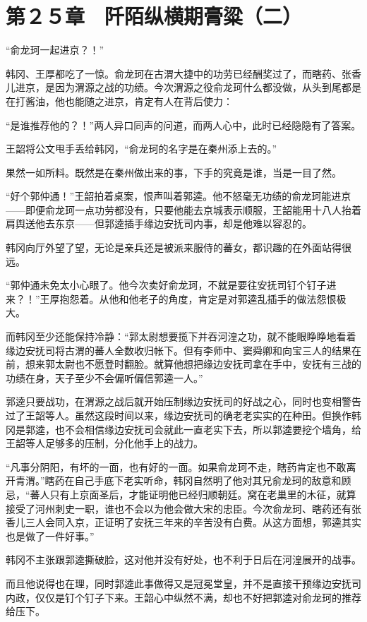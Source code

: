 \section{第２５章　阡陌纵横期膏粱（二）}

“俞龙珂一起进京？！”

韩冈、王厚都吃了一惊。俞龙珂在古渭大捷中的功劳已经酬奖过了，而瞎药、张香儿进京，是因为渭源之战的功绩。今次渭源之役俞龙珂什么都没做，从头到尾都是在打酱油，他也能随之进京，肯定有人在背后使力：

“是谁推荐他的？！”两人异口同声的问道，而两人心中，此时已经隐隐有了答案。

王韶将公文甩手丢给韩冈，“俞龙珂的名字是在秦州添上去的。”

果然一如所料。既然是在秦州做出来的事，下手的究竟是谁，当是一目了然。

“好个郭仲通！”王韶拍着桌案，恨声叫着郭逵。他不怒毫无功绩的俞龙珂能进京——即便俞龙珂一点功劳都没有，只要他能去京城表示顺服，王韶能用十八人抬着肩舆送他去东京——但郭逵插手缘边安抚司内事，却是他难以容忍的。

韩冈向厅外望了望，无论是亲兵还是被派来服侍的蕃女，都识趣的在外面站得很远。

“郭仲通未免太小心眼了。他今次卖好俞龙珂，不就是要往安抚司钉个钉子进来？！”王厚抱怨着。从他和他老子的角度，肯定是对郭逵乱插手的做法怨恨极大。

而韩冈至少还能保持冷静：“郭太尉想要揽下并吞河湟之功，就不能眼睁睁地看着缘边安抚司将古渭的蕃人全数收归帐下。但有李师中、窦舜卿和向宝三人的结果在前，想来郭太尉也不愿登时翻脸。就算他想把缘边安抚司拿在手中，安抚有三战的功绩在身，天子至少不会偏听偏信郭逵一人。”

郭逵只要战功，在渭源之战后就开始压制缘边安抚司的好战之心，同时也变相警告过了王韶等人。虽然这段时间以来，缘边安抚司的确老老实实的在种田。但换作韩冈是郭逵，也不会相信缘边安抚司会就此一直老实下去，所以郭逵要挖个墙角，给王韶等人足够多的压制，分化他手上的战力。

“凡事分阴阳，有坏的一面，也有好的一面。如果俞龙珂不走，瞎药肯定也不敢离开青渭。”瞎药在自己手底下老实听命，韩冈自然明了他对其兄俞龙珂的敌意和顾忌，“蕃人只有上京面圣后，才能证明他已经归顺朝廷。窝在老巢里的木征，就算接受了河州刺史一职，谁也不会以为他会做大宋的忠臣。今次俞龙珂、瞎药还有张香儿三人会同入京，正证明了安抚三年来的辛苦没有白费。从这方面想，郭逵其实也是做了一件好事。”

韩冈不主张跟郭逵撕破脸，这对他并没有好处，也不利于日后在河湟展开的战事。

而且他说得也在理，同时郭逵此事做得又是冠冕堂皇，并不是直接干预缘边安抚司内政，仅仅是钉个钉子下来。王韶心中纵然不满，却也不好把郭逵对俞龙珂的推荐给压下。

